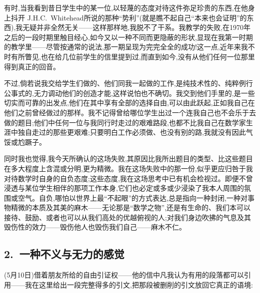 有时,当我看到昔日学生中的某一位,以轻蔑的态度对待这件弥足珍贵的东西,在他身上抖开 J.H.C.~Whitehead所说的那种“势利”(就是瞧不起自己“本来也会证明”的东西),我无疑并非全然无关——这样那样地,我脱不了干系。我教学的失败,在1970年之后的一段时期里触目经心,如今又以一种不同而更隐蔽的形状,显现在我第一时期的教学里——尽管按通常的说法,那一期呈现为完完全全的成功!这一点,近年来我不时有所瞥见,也在给几位前学生的信里提到过,而直到如今,没有从他们任何一位那里得到真正的回音。

不过,倘若说我交给学生们做的、他们同我一起做的工作,是纯技术性的、纯粹例行公事式的,无力调动他们的创造才能,这样说怕也不确切。我交到他们手里的,是一些切实而可靠的出发点,他们在其中享有全部的选择自由,可以由此跃起,正如我自己在他们之前曾经做过的那样。我不记得曾给哪位学生出过一个连我自己也不会乐于去做的题目;他们中任何一位与我同行时走过的艰难路段,也都不比我自己在数学家生涯中独自走过的那些更艰难;只要明白工作必须做、也没有别的路,我就没有因此气馁或尥蹶子。

\pmark{} 同时我也觉得,我今天所确认的这场失败,其原因比我所出题目的类型、比这些题目在多大程度上含混或分明,更为精微。我在这场失败中的那一份,似乎更应归咎于我对待数学时自身的自负态度;这些态度,我在这场思考中已有机会检视过。即便不曾浸透与某位学生相伴的那项工作本身,它们也必定或多或少浸染了我本人周围的氛围或空气。自负,哪怕以世界上最“不起眼”的方式表达,总是指向一种封闭,一种对事物精微的本质及其美的麻木——无论那是“数学之物”,还是有生命的、我们本可以接待、鼓励、或者也可以从我们高处的优越俯视的人;对我们身边吹拂的气息及其毁伤性的效力——毁伤他人也毁伤我们自己——麻木不仁。

\subsection{2.~一种不义与无力的感觉}


(5月10日)借着朋友所给的自由引证权——他的信中凡我认为有用的段落都可以引用——我在这里给出一段完整得多的引文,把那段被删削的引文放回它真正的语境:

